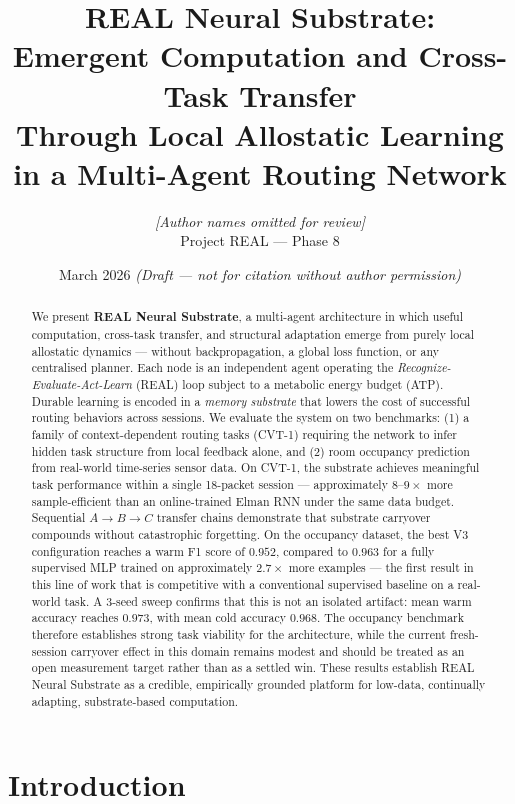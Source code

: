 \documentclass[10pt,twocolumn]{article}
\title{%
  \textbf{REAL Neural Substrate:}\\
  Emergent Computation and Cross-Task Transfer\\
  Through Local Allostatic Learning\\
  in a Multi-Agent Routing Network
}
\author{%
  \textit{[Author names omitted for review]}\\
  \small Project REAL --- Phase 8
}
\date{March 2026 \quad \textit{(Draft --- not for citation without author permission)}}
\begin{document}
\maketitle

\begin{abstract}
We present \textbf{REAL Neural Substrate}, a multi-agent architecture in which
useful computation, cross-task transfer, and structural adaptation emerge from
purely local allostatic dynamics --- without backpropagation, a global loss
function, or any centralised planner.
Each node is an independent agent operating the \emph{Recognize-Evaluate-Act-Learn}
(REAL) loop subject to a metabolic energy budget (ATP).
Durable learning is encoded in a \emph{memory substrate} that lowers the cost of
successful routing behaviors across sessions.
We evaluate the system on two benchmarks: (1) a family of context-dependent
routing tasks (CVT-1) requiring the network to infer hidden task structure from
local feedback alone, and (2) room occupancy prediction from real-world
time-series sensor data.
On CVT-1, the substrate achieves meaningful task performance within a single
18-packet session --- approximately $8$--$9\times$ more sample-efficient than an
online-trained Elman RNN under the same data budget.
Sequential $A \to B \to C$ transfer chains demonstrate that substrate carryover
compounds without catastrophic forgetting.
On the occupancy dataset, the best V3 configuration reaches a warm F1 score
of $\mathbf{0.952}$, compared to $0.963$ for a fully supervised MLP trained on
approximately $2.7\times$ more examples --- the first result in this line of
work that is competitive with a conventional supervised baseline on a
real-world task.
A 3-seed sweep confirms that this is not an isolated artifact: mean warm
accuracy reaches $0.973$, with mean cold accuracy $0.968$.
The occupancy benchmark therefore establishes strong task viability for the
architecture, while the current fresh-session carryover effect in this domain
remains modest and should be treated as an open measurement target rather than
as a settled win.
These results establish REAL Neural Substrate as a credible, empirically
grounded platform for low-data, continually adapting, substrate-based
computation.
\end{abstract}

\section{Introduction}
\label{sec:intro}
\end{document}
